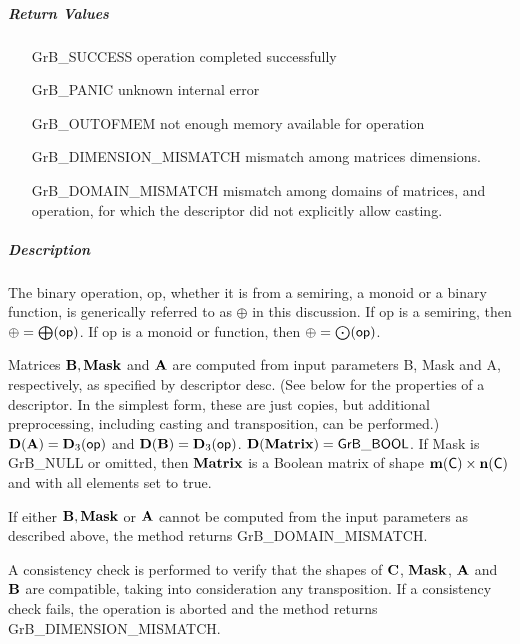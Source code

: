 \subparagraph{Return Values}

\begin{itemize}[leftmargin=2.1in]
    \item[{\sf GrB\_SUCCESS}]             operation completed successfully
    \item[{\sf GrB\_PANIC}]               unknown internal error
    \item[{\sf GrB\_OUTOFMEM}]            not enough memory available for operation
    \item[{\sf GrB\_DIMENSION\_MISMATCH}] mismatch among matrices dimensions.
    \item[{\sf GrB\_DOMAIN\_MISMATCH}]    mismatch among domains of matrices, and operation, for which the descriptor did not explicitly allow casting.
\end{itemize}

\subparagraph{Description}

The binary operation, {\sf op}, whether it is from a semiring, a monoid or a binary function,
is generically referred to as $\oplus$ in this discussion.
If {\sf op} is a semiring, then $\oplus = \bigoplus({\sf op})$. 
If {\sf op} is a monoid or function, then $\oplus = \bigodot({\sf op})$.

Matrices ${\bf B}, {\bf Mask}$ and ${\bf A}$ are computed from
input parameters {\sf B}, {\sf Mask} and {\sf A}, respectively, as specified
by descriptor {\sf desc}. (See below for the properties of a descriptor. In
the simplest form, these are just copies, but additional preprocessing,
including casting and transposition, can be performed.)  $\bold{D}({\bf A}) =
\bold{D}_3({\sf op})$ and $\bold{D}({\bf B}) = \bold{D}_3({\sf op})$.
$\bold{D}({\bf Matrix}) = {\sf GrB\_BOOL}$.  If {\sf Mask} is {\sf GrB\_NULL} or omitted,
then ${\bf Matrix}$ is a Boolean matrix of shape $\bold{m}({\bf \sf C}) \times \bold{n}({\bf \sf C})$
and with all elements set to {\sf true}.

If either ${\bf B}, {\bf Mask}$ or ${\bf A}$ cannot be computed
from the input parameters as described above, the method returns {\sf
    GrB\_DOMAIN\_MISMATCH}.

A consistency check is performed to verify that the shapes of ${\bf C}$, ${\bf Mask}$, ${\bf A}$ and ${\bf B}$
are compatible, taking into consideration any transposition. If a consistency check fails, the operation is
aborted and the method returns {\sf GrB\_DIMENSION\_MISMATCH}.

